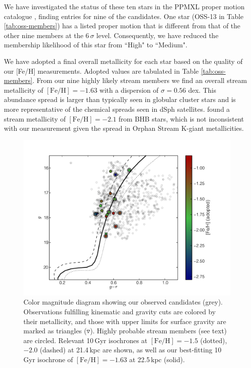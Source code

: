 \documentclass{emulateapj}
\begin{document}
We have investigated the status of these ten stars in the PPMXL proper motion catalogue \citep{Roeser;et-al_2010}, finding entries for nine of the candidates. One star (OSS-13 in Table \ref{tab:oss-members}) has a listed proper motion that is different from that of the other nine members at the $6\,\sigma$ level. Consequently, we have reduced the membership likelihood of this star from ``High" to ``Medium".

We have adopted a final overall metallicity for each star based on the quality of our [Fe/H] measurements. Adopted values are tabulated in Table \ref{tab:oss-members}. From our nine highly likely stream members we find an overall stream metallicity of $[\mbox{Fe/H}] = -1.63$ with a dispersion of $\sigma = 0.56$ dex. This abundance spread is larger than typically seen in globular cluster stars and is more representative of the chemical spreads seen in dSph satellites. \citet{Newberg;et-al_2010} found a stream metallicity of $[\mbox{Fe/H}] = -2.1$ from BHB stars, which is not inconsistent with our measurement given the spread in Orphan Stream K-giant metallicities.

\begin{figure}[h!]
	\includegraphics[width=\columnwidth]{./figures/cmd.pdf}
	\caption{Color magnitude diagram showing our observed candidates (grey). Observations fulfilling kinematic and gravity cuts are colored by their metallicity, and those with upper limits for surface gravity are marked as triangles ($\triangledown$). Highly probable stream members (see text) are circled. Relevant 10\,Gyr \citet{Girardi;et-al_2008} isochrones at $[\mbox{Fe/H}] = -1.5$ (dotted), $-2.0$ (dashed) at 21.4\,kpc \citep{Newberg;et-al_2010} are shown, as well as our best-fitting 10\,Gyr isochrone of $[\mbox{Fe/H}] = -1.63$ at 22.5\,kpc (solid).}
	\label{fig:cmd}
\end{figure}
\end{document}

